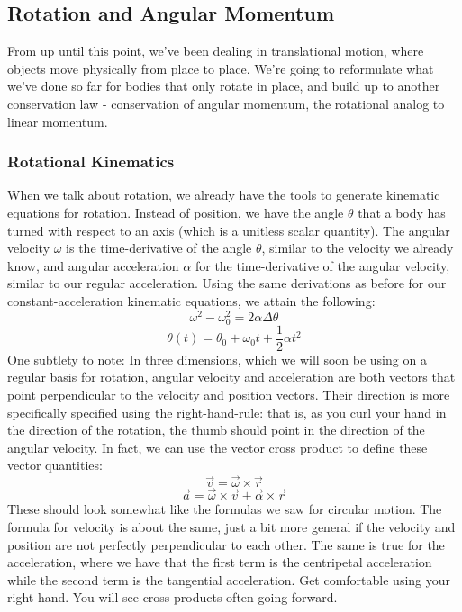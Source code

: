 \subsection{Rotation and Angular Momentum}
From up until this point, we've been dealing in translational motion, where objects move physically from place to place. We're going to reformulate what we've done so far for bodies that only rotate in place, and build up to another conservation law - conservation of angular momentum, the rotational analog to linear momentum. 
\subsubsection{Rotational Kinematics}
When we talk about rotation, we already have the tools to generate kinematic equations for rotation. Instead of position, we have the angle $\theta$ that a body has turned with respect to an axis (which is a unitless scalar quantity). The angular velocity $\omega$ is the time-derivative of the angle $\theta$, similar to the velocity we already know, and angular acceleration $\alpha$ for the time-derivative of the angular velocity, similar to our regular acceleration. Using the same derivations as before for our constant-acceleration kinematic equations, we attain the following: 
\[
	\omega^2 - \omega_0^2 = 2\alpha\Delta\theta
\]
\[
	\theta(t) = \theta_0 + \omega_0 t + \frac{1}{2} \alpha t^2 
\]
One subtlety to note: In three dimensions, which we will soon be using on a regular basis for rotation, angular velocity and acceleration are both vectors that point perpendicular to the velocity and position vectors. Their direction is more specifically specified using the right-hand-rule: that is, as you curl your hand in the direction of the rotation, the thumb should point in the direction of the angular velocity. In fact, we can use the vector cross product to define these vector quantities: 
\[
	\vec v = \vec \omega \times \vec r
\]
\[
	\vec a = \vec \omega \times \vec v + \vec \alpha \times \vec r
\]
These should look somewhat like the formulas we saw for circular motion. The formula for velocity is about the same, just a bit more general if the velocity and position are not perfectly perpendicular to each other. The same is true for the acceleration, where we have that the first term is the centripetal acceleration while the second term is the tangential acceleration. Get comfortable using your right hand. You will see cross products often going forward. 
